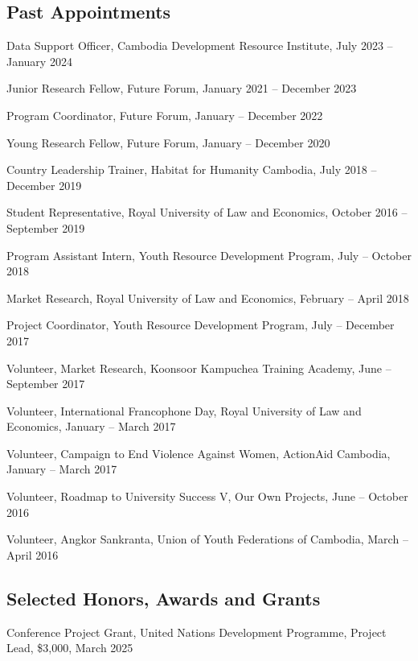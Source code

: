 \documentclass[10pt,a4paper]{article}
\begin{document}
\subsection*{Past Appointments}

	Data Support Officer, Cambodia Development Resource Institute, July 2023 -- January 2024

	Junior Research Fellow, Future Forum, January 2021 -- December 2023
	
	Program Coordinator, Future Forum, January -- December 2022
	
	Young Research Fellow, Future Forum, January -- December 2020

	Country Leadership Trainer, Habitat for Humanity Cambodia, July 2018 -- December 2019
	
	Student Representative, Royal University of Law and Economics, October 2016 -- September 2019
	
	Program Assistant Intern, Youth Resource Development Program, July -- October 2018
	
	Market Research, Royal University of Law and Economics, February -- April 2018
	
	Project Coordinator, Youth Resource Development Program, July -- December 2017
	
	Volunteer, Market Research, Koonsoor Kampuchea Training Academy, June -- September 2017
	
	Volunteer, International Francophone Day,  Royal University of Law and Economics, January -- March 2017
	
	Volunteer, Campaign to End Violence Against Women, ActionAid Cambodia, January -- March 2017
	
	Volunteer, Roadmap to University Success V, Our Own Projects, June -- October 2016
	
	Volunteer, Angkor Sankranta, Union of Youth Federations of Cambodia, March -- April 2016

\subsection*{Selected Honors, Awards and Grants}

\parindent=0pt
	
	Conference Project Grant, United Nations Development Programme, Project Lead, \$3,000, March 2025
	
\end{document}
